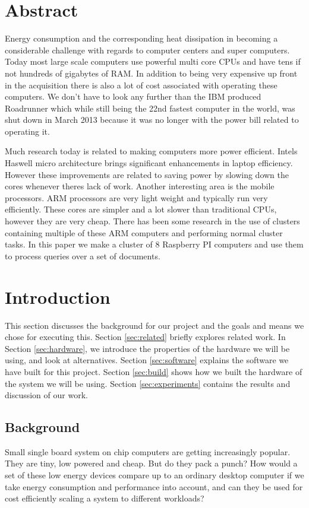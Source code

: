 \clearpage

\section{Abstract}
Energy consumption and the corresponding heat dissipation in becoming a considerable challenge with regards to computer centers and super computers. Today most large scale computers use powerful multi core CPUs and have tens if not hundreds of gigabytes of RAM. In addition to being very expensive up front in the acquisition there is also a lot of cost associated with operating these computers. We don't have to look any further than the IBM produced Roadrunner which while still being the 22nd fastest computer in the world, was shut down in March 2013 because it was no longer with the power bill related to operating it.\cite{roadrunner}

Much research today is related to making computers more power efficient. Intels Haswell micro architecture brings significant enhancements in laptop efficiency. However these improvements are related to saving power by slowing down the cores whenever theres lack of work. Another interesting area is the mobile processors. ARM processors are very light weight and typically run very efficiently. These cores are simpler and a lot slower than traditional CPUs, however they are very cheap. There has been some research in the use of clusters containing multiple of these ARM computers and performing normal cluster tasks. In this paper we make a cluster of 8 Raspberry PI computers and use them to process queries over a set of documents.


\section{Introduction}
\label{sec:introduction}
This section discusses the background for our project and the goals and means we chose for executing this.
Section \ref{sec:related} briefly explores related work.
In Section \ref{sec:hardware}, we introduce the properties of the hardware we will be using, and look at alternatives.
Section \ref{sec:software} explains the software we have built for this project.
Section \ref{sec:build} shows how we built the hardware of the system we will be using.
Section \ref{sec:experiments} contains the results and discussion of our work.

\subsection{Background}
Small single board system on chip computers are getting increasingly popular. They are tiny, low powered and cheap. But do they pack a punch?
How would a set of these low energy devices compare up to an ordinary desktop computer if we take energy consumption and performance into account, and can they be used for cost efficiently scaling a system to different workloads?

